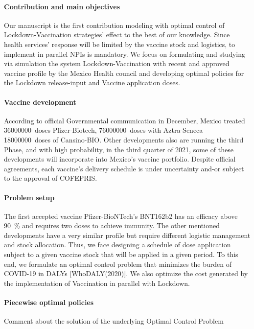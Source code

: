 \paragraph{Contribution and main objectives}
        Our manuscript is the first contribution modeling with optimal control 
    of Lockdown-Vaccination strategies' effect to the best of our knowledge. 
    Since health services' response will be limited by the vaccine stock
    and logistics, to implement in parallel NPIs is mandatory. We focus on 
    formulating and studying via simulation the system Lockdown-Vaccination 
    with recent and approved vaccine profile by the  Mexico Health council and 
    developing optimal policies for the Lockdown release-input and Vaccine 
    application doses.
\paragraph{Vaccine development}
        According to official Governmental communication in December, Mexico 
    treated  \SI{36000000}{doses} Pfizer-Biotech, \SI{76000000}{doses} with 
    Aztra-Seneca \SI{18000000}{doses} of Cansino-BIO. Other developments 
    also are running the  third Phase, and with high probability,  in the 
    third quarter of 2021, some of these developments will incorporate into 
    Mexico's vaccine portfolio. Despite official agreements, each vaccine's 
    delivery schedule is under uncertainty and-or subject to the approval 
    of COFEPRIS.
\paragraph{Problem setup}
        The first accepted vaccine \textemdash Pfizer-BioNTech's BNT162b2 
    \textemdash has an efficacy above \SI{90}{\percent}  and requires 
    two doses to achieve immunity. The other mentioned developments have a very 
    similar profile but require different logistic management and stock 
    allocation.  Thus, we face designing a schedule of dose application subject 
    to a given vaccine stock that will be applied in a given period. To this 
    end, we formulate an optimal control problem that minimizes the burden of 
    COVID-19 in DALYs [WhoDALY(2020)]. We also optimize the cost generated by 
    the implementation of Vaccination in parallel with Lockdown.

\paragraph{Piecewise optimal policies}
    Comment about the solution of the underlying Optimal Control Problem
    
